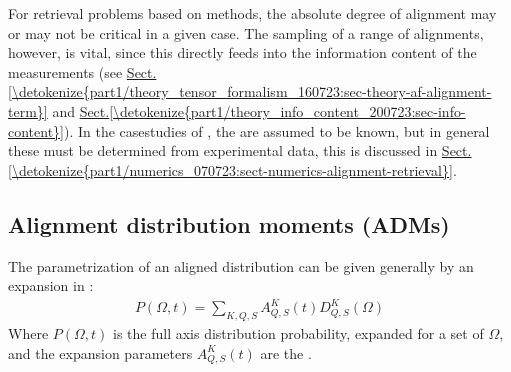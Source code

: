 \documentclass[letterpaper,table,10pt,english]{jupyterBook}
\begin{document}
\sphinxAtStartPar
For {\hyperref[\detokenize{backmatter/glossary:term-radial-matrix-elements}]{}} retrieval problems based on {\hyperref[\detokenize{backmatter/glossary:term-RWP}]{}} methods, the absolute degree of alignment may \sphinxhyphen{} or may not \sphinxhyphen{} be critical in a given case. The sampling of a range of  alignments, however, is vital, since this directly feeds into the information content of the measurements (see \hyperref[\detokenize{part1/theory_tensor_formalism_160723:sec-theory-af-alignment-term}]{Sect.\@ \ref{\detokenize{part1/theory_tensor_formalism_160723:sec-theory-af-alignment-term}}} and \hyperref[\detokenize{part1/theory_info_content_200723:sec-info-content}]{Sect.\@ \ref{\detokenize{part1/theory_info_content_200723:sec-info-content}}}). In the case\sphinxhyphen{}studies of {\hyperref[\detokenize{part2/extracting_matrix_elements_overview_270423:chpt-extracting-matrix-elements-overview}]{}}, the {\hyperref[\detokenize{backmatter/glossary:term-ADMs}]{}} are assumed to be known, but in general these must be determined from experimental data, this is discussed in \hyperref[\detokenize{part1/numerics_070723:sect-numerics-alignment-retrieval}]{Sect.\@ \ref{\detokenize{part1/numerics_070723:sect-numerics-alignment-retrieval}}}.


\subsection{Alignment distribution moments (ADMs)}
\label{\detokenize{part1/theory_molecular_alignment_170723:alignment-distribution-moments-adms}}
\sphinxAtStartPar
The parametrization of an aligned distribution can be given generally by an expansion in {\hyperref[\detokenize{backmatter/glossary:term-Wigner-rotation-matrix-elements}]{}}:
\begin{equation}\label{equation:part1/theory_molecular_alignment_170723:eqn:P-omega-t}
\begin{split} 
P(\Omega,t) = \sum_{K,Q,S} A^K_{Q,S}(t)D^K_{Q,S}(\Omega)
\end{split}
\end{equation}
\sphinxAtStartPar
Where \(P(\Omega,t)\) is the full axis distribution probability, expanded for a set of {\hyperref[\detokenize{backmatter/glossary:term-Euler-angles}]{}} \(\Omega\), and the expansion parameters \(A^K_{Q,S}(t)\) are the {\hyperref[\detokenize{backmatter/glossary:term-ADMs}]{}}.
\end{document}
